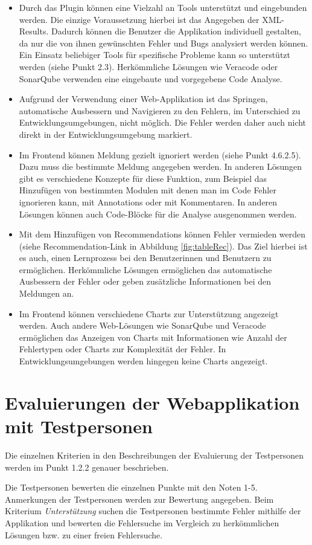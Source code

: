 \begin{itemize}
\item Durch das Plugin können eine Vielzahl an Tools unterstützt und eingebunden werden. Die einzige Voraussetzung hierbei ist das Angegeben der XML-Results. Dadurch können die Benutzer die Applikation individuell gestalten, da nur die von ihnen gewünschten Fehler und Bugs analysiert werden können. Ein Einsatz beliebiger Tools für spezifische Probleme kann so unterstützt werden (siehe Punkt 2.3). Herkömmliche Lösungen wie Veracode oder SonarQube verwenden eine eingebaute und vorgegebene Code Analyse.
\item Aufgrund der Verwendung einer Web-Applikation ist das Springen, automatische Ausbessern und Navigieren zu den Fehlern, im Unterschied zu Entwicklungsumgebungen, nicht möglich. Die Fehler werden daher auch nicht direkt in der Entwicklungsumgebung markiert.
\item Im Frontend können Meldung gezielt ignoriert werden (siehe Punkt 4.6.2.5). Dazu muss die bestimmte Meldung angegeben werden. In anderen Lösungen gibt es verschiedene Konzepte für diese Funktion, zum Beispiel das Hinzufügen von bestimmten Modulen mit denen man im Code Fehler ignorieren kann, mit Annotations oder mit Kommentaren. In anderen Lösungen können auch Code-Blöcke für die Analyse ausgenommen werden.
\item Mit dem Hinzufügen von Recommendations können Fehler vermieden werden (siehe Recommendation-Link in Abbildung \ref{fig:tableRec}). Das Ziel hierbei ist es auch, einen Lernprozess bei den Benutzerinnen und Benutzern zu ermöglichen. Herkömmliche Lösungen ermöglichen das automatische Ausbessern der Fehler oder geben zusätzliche  Informationen bei den Meldungen an.



\item Im Frontend können verschiedene Charts zur Unterstützung angezeigt werden. Auch andere Web-Lösungen wie SonarQube und Veracode ermöglichen das Anzeigen von Charts mit Informationen wie Anzahl der Fehlertypen oder Charts zur Komplexität der Fehler. In Entwicklungsumgebungen werden hingegen keine Charts angezeigt.
\end{itemize}
\section{Evaluierungen der Webapplikation mit Testpersonen} 
Die einzelnen Kriterien in den Beschreibungen der Evaluierung der Testpersonen werden im Punkt 1.2.2 genauer beschrieben. 

Die Testpersonen bewerten die einzelnen Punkte mit den Noten 1-5. Anmerkungen der Testpersonen werden zur Bewertung angegeben. Beim Kriterium \textit{Unterstützung} suchen die Testpersonen bestimmte Fehler  mithilfe der Applikation und bewerten die Fehlersuche im Vergleich zu herkömmlichen Lösungen bzw. zu einer freien Fehlersuche.
